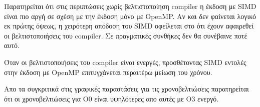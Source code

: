 \documentclass[a4paper,11pt]{article}
\begin{document}
Παρατηρείται ότι στις περιπτώσεις χωρίς βελτιστοποίηση compiler η έκδοση με SIMD είναι πιο αργή σε σχέση με την έκδοση μόνο με OpenMP. Αν και δεν φαίνεται λογικό εκ πρώτης όψεως, η χειρότερη απόδοση του SIMD οφείλεται στο ότι έχουν αφαιρεθεί οι βελτιστοποιήσεις του compiler. Σε πραγματικές συνθήκες δεν θα συνέβαινε ποτέ αυτό.

Όταν οι βελτιστοποιήσεις του compiler είναι ενεργές, προσθέτοντας SIMD εντολές στην έκδοση με OpenMP επιτυγχάνεται περαιτέρω μείωση του χρόνου.

Απο τα συγκριτικά στις γραφικές παραστάσεις για τις χρονοβελτιώσεις παρατηρείται ότι οι χρονοβελτιώσεις για Ο0 είναι υψηλότερες απο αυτές με Ο3 ενεργό. 
\end{document}
